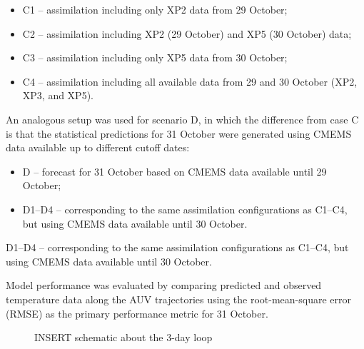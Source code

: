 \begin{itemize}
    \item C1 – assimilation including only XP2 data from 29 October;
    \item C2 – assimilation including XP2 (29 October) and XP5 (30 October) data;
    \item C3 – assimilation including only XP5 data from 30 October;
    \item C4 – assimilation including all available data from 29 and 30 October (XP2, XP3, and XP5).
\end{itemize}

An analogous setup was used for scenario D, in which the difference
from case C is that the statistical predictions for 31 October were
generated using CMEMS data available up to different cutoff dates:

\begin{itemize}
    \item D – forecast for 31 October based on CMEMS data available until 29 October;
    \item D1–D4 – corresponding to the same assimilation
      configurations as C1–C4, but using CMEMS data available until 30
      October.
\end{itemize}
D1–D4 – corresponding to the same assimilation configurations as
C1–C4, but using CMEMS data available until 30 October.

Model performance was evaluated by comparing predicted and observed
temperature data along the AUV trajectories using the root-mean-square
error (RMSE) as the primary performance metric for 31 October.

\begin{figure}
    \centering
    \caption{INSERT schematic about the 3-day loop}
    \label{fig:temperatureprofiles}
\end{figure}


%
    

